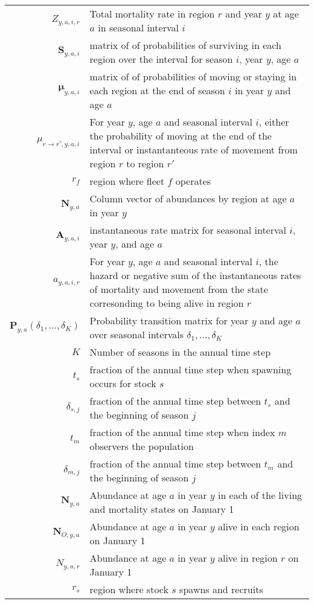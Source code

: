 \begin{longtable}[c]{r p{}}
$Z_{y,a,i,r}$ & Total mortality rate in region $r$ and year $y$ at age $a$ in seasonal interval $i$\\
$\mathbf{S}_{y,a,i}$ & matrix of of probabilities of surviving in each region over the interval for season $i$, year $y$, age $a$ \\
$\boldsymbol{\mu}_{y,a,i}$ & matrix of of probabilities of moving or staying in each region at the end of season $i$ in year $y$ and age $a$ \\
$\mu_{r\rightarrow r',y,a,i}$ & For year $y$, age $a$ and seasonal interval $i$, either the probability of moving at the end of the interval or instantanteous rate of movement from region $r$ to region $r'$\\
$r_f$ & region where fleet $f$ operates\\
$\mathbf{N}_{y,a}$ & Column vector of abundances by region at age $a$ in year $y$\\
$\mathbf{A}_{y,a,i}$ & instantaneous rate matrix for seasonal interval $i$, year $y$, and age $a$\\
$a_{y,a,i,r}$ & For year $y$, age $a$ and seasonal interval $i$, the hazard or negative sum of the instantaneous rates of mortality and movement from the state corresonding to being alive in region $r$ \\
$\mathbf{P}_{y,a}(\delta_1,\ldots,\delta_K)$ & Probability transition matrix for year $y$ and age $a$ over seasonal intervals $\delta_1,\ldots, \delta_K$\\
$K$ & Number of seasons in the annual time step\\
$t_s$ & fraction of the annual time step when spawning occurs for stock $s$\\
$\delta_{s,j}$ & fraction of the annual time step between $t_s$ and the beginning of season $j$\\
$t_m$ & fraction of the annual time step when index $m$ observers the population\\
$\delta_{m,j}$ & fraction of the annual time step between $t_m$ and the beginning of season $j$\\
$\mathbf{N}_{y,a}$ & Abundance at age $a$ in year $y$ in each of the living and mortality states on January 1\\
$\mathbf{N}_{O,y,a}$ & Abundance at age $a$ in year $y$ alive in each region on January 1\\
$N_{y,a,r}$ & Abundance at age $a$ in year $y$ alive in region $r$ on January 1\\
$r_s$ & region where stock $s$ spawns and recruits\\

\end{longtable}
